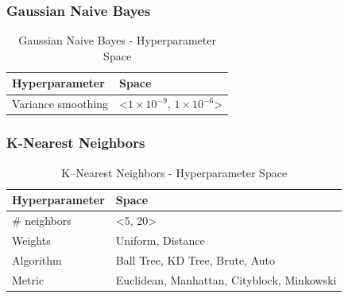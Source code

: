         \subsubsection{Gaussian Naive Bayes}
        
        \begin{table}[H]
            \small
            \setlength{\tabcolsep}{8pt}
            \renewcommand{\arraystretch}{1.3}
            \centering
                \caption[Gaussian Naive Bayes - Hyperparameter Space]{Gaussian Naive Bayes  - Hyperparameter Space}\label{tab:gnbspace}
                \begin{tabular}{ll}
            \toprule
            \textbf{Hyperparameter} & \textbf{Space}\\
            \midrule
            \hline
            Variance smoothing & <$1\times 10^{-9}$, $1\times 10^{-6}$> \\
            \hline
            \bottomrule
            \end{tabular}
            \vspace{0.7em}
        
            \vspace{-1em}
        \end{table}
        
        
        
        \subsubsection{K-Nearest Neighbors}
        
        \begin{table}[H]
            \small
            \setlength{\tabcolsep}{8pt}
            \renewcommand{\arraystretch}{1.3}
            \centering
                \caption[K--Nearest Neighbors - Hyperparameter Space]{K--Nearest Neighbors - Hyperparameter Space}\label{tab:knnspace}
                \begin{tabular}{ll}
            \toprule
            \textbf{Hyperparameter} & \textbf{Space}\\
            \midrule
            \hline
            \# neighbors & <5, 20> \\
            Weights & Uniform, Distance \\
            Algorithm & Ball Tree, KD Tree, Brute, Auto \\
            Metric & Euclidean, Manhattan, Cityblock, Minkowski \\
            \hline
            \bottomrule
            \end{tabular}
            \vspace{0.7em}
        
            \vspace{-1em}
        \end{table}
        
